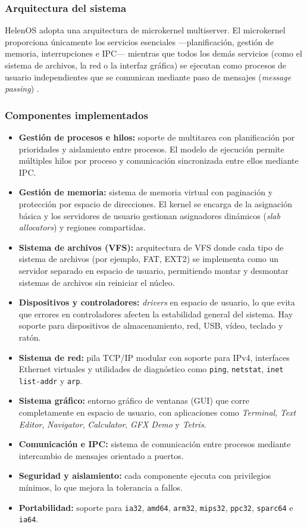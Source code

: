 \subsubsection{Arquitectura del sistema}
HelenOS adopta una arquitectura de microkernel multiserver. El microkernel proporciona únicamente los servicios esenciales —planificación, gestión de memoria, interrupciones e IPC— mientras que todos los demás servicios (como el sistema de archivos, la red o la interfaz gráfica) se ejecutan como procesos de usuario independientes que se comunican mediante paso de mensajes (\textit{message passing}) \cite{helenos_prjdoc}.

\subsubsection{Componentes implementados}
\begin{itemize}
    \item \textbf{Gestión de procesos e hilos:} soporte de multitarea con planificación por prioridades y aislamiento entre procesos. El modelo de ejecución permite múltiples hilos por proceso y comunicación sincronizada entre ellos mediante IPC.
    \item \textbf{Gestión de memoria:} sistema de memoria virtual con paginación y protección por espacio de direcciones. El kernel se encarga de la asignación básica y los servidores de usuario gestionan asignadores dinámicos (\textit{slab allocators}) y regiones compartidas.
    \item \textbf{Sistema de archivos (VFS):} arquitectura de VFS donde cada tipo de sistema de archivos (por ejemplo, FAT, EXT2) se implementa como un servidor separado en espacio de usuario, permitiendo montar y desmontar sistemas de archivos sin reiniciar el núcleo.
    \item \textbf{Dispositivos y controladores:} \textit{drivers} en espacio de usuario, lo que evita que errores en controladores afecten la estabilidad general del sistema. Hay soporte para dispositivos de almacenamiento, red, USB, vídeo, teclado y ratón.
    \item \textbf{Sistema de red:} pila TCP/IP modular con soporte para IPv4, interfaces Ethernet virtuales y utilidades de diagnóstico como \texttt{ping}, \texttt{netstat}, \texttt{inet list-addr} y \texttt{arp}.
    \item \textbf{Sistema gráfico:} entorno gráfico de ventanas (GUI) que corre completamente en espacio de usuario, con aplicaciones como \textit{Terminal}, \textit{Text Editor}, \textit{Navigator}, \textit{Calculator}, \textit{GFX Demo} y \textit{Tetris}.
    \item \textbf{Comunicación e IPC:} sistema de comunicación entre procesos mediante intercambio de mensajes orientado a puertos.
    \item \textbf{Seguridad y aislamiento:} cada componente ejecuta con privilegios mínimos, lo que mejora la tolerancia a fallos.
    \item \textbf{Portabilidad:} soporte para \texttt{ia32}, \texttt{amd64}, \texttt{arm32}, \texttt{mips32}, \texttt{ppc32}, \texttt{sparc64} e \texttt{ia64}.
\end{itemize}

